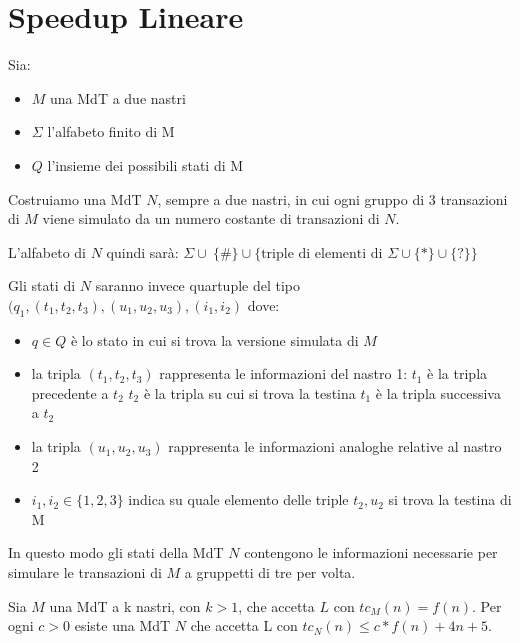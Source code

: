 \section{Speedup Lineare}

Sia:
\begin{itemize}
	\item $M$ una MdT a due nastri
	\item $\Sigma$ l'alfabeto finito di M
	\item $Q$ l'insieme dei possibili stati di M
\end{itemize}

Costruiamo una MdT $N$, sempre a due nastri, in cui ogni gruppo di 3 transazioni di $M$ viene simulato da un numero costante di transazioni di $N$.

L'alfabeto di $N$ quindi sarà: $ \Sigma \cup \ \{\#\} \cup \{ \text{triple di elementi di } \Sigma \cup \{\ast\} \cup \{?\} \} $

Gli stati di $N$ saranno invece quartuple del tipo $(q_1, (t_1, t_2, t_3), (u_1, u_2, u_3), (i_1, i_2)$ dove:

\begin{itemize}
	\item $q \in Q$ è lo stato in cui si trova la versione simulata di $M$
	\item la tripla $(t_1, t_2, t_3)$ rappresenta le informazioni del nastro 1:
		\subitem $t_1$ è la tripla precedente a $t_2$
		\subitem $t_2$ è la tripla su cui si trova la testina
		\subitem $t_1$ è la tripla successiva a $t_2$
	\item la tripla $(u_1, u_2, u_3)$ rappresenta le informazioni analoghe relative al nastro 2
	\item $i_1, i_2 \in \{1, 2, 3\}$ indica su quale elemento delle triple $t_2, u_2$ si trova la testina di M
\end{itemize}

In questo modo gli stati della MdT $N$ contengono le informazioni necessarie per simulare le transazioni di $M$ a gruppetti di tre per volta. \\

\begin{lemm}
	Sia $M$ una MdT a k nastri, con $k > 1$, che accetta $L$ con $tc_M(n) = f(n)$.
	Per ogni $c > 0$ esiste una MdT $N$ che accetta L con $tc_N(n) \leq c*f(n) + 4n + 5$.
\end{lemm}

